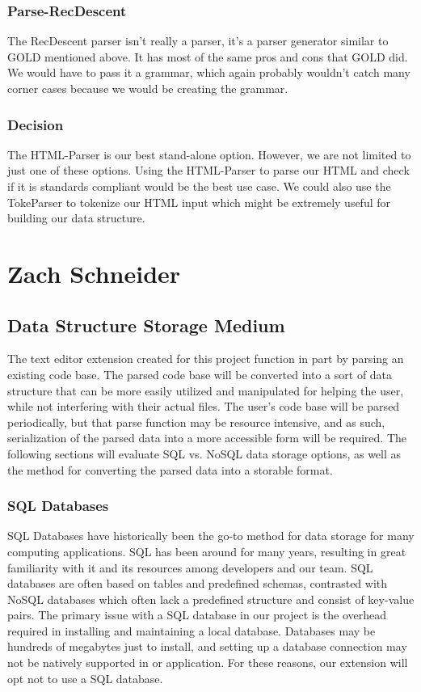 \documentclass[letterpaper,10pt,titlepage,draftclsnofoot,onecolumn,onesided] {IEEEtran}
\begin{document}
\subsubsection{Parse-RecDescent}
The RecDescent parser isn't really a parser, it's a parser generator similar to GOLD mentioned above.
It has most of the same pros and cons that GOLD did. 
We would have to pass it a grammar, which again probably wouldn't catch many corner cases because we would be creating the grammar.
\cite{recdescent}

\subsubsection{Decision}
The HTML-Parser is our best stand-alone option.
However, we are not limited to just one of these options.
Using the HTML-Parser to parse our HTML and check if it is standards compliant would be the best use case.
We could also use the TokeParser to tokenize our HTML input which might be extremely useful for building our data structure. 

\section{Zach Schneider}

\subsection{Data Structure Storage Medium}
The text editor extension created for this project function in part by parsing an existing code base. The parsed code base will be converted into a sort of data structure that can be more easily utilized and manipulated for helping the user, while not interfering with their actual files. The user's code base will be parsed periodically, but that parse function may be resource intensive, and as such, serialization of the parsed data into a more accessible form will be required. The following sections will evaluate SQL vs. NoSQL data storage options, as well as the method for converting the parsed data into a storable format.

\subsubsection{SQL Databases}
SQL Databases have historically been the go-to method for data storage for many computing applications. SQL has been around for many years, resulting in great familiarity with it and its resources among developers and our team. SQL databases are often based on tables and predefined schemas, contrasted with NoSQL databases which often lack a predefined structure and consist of key-value pairs. The primary issue with a SQL database in our project is the overhead required in installing and maintaining a local database. Databases may be hundreds of megabytes just to install, and setting up a database connection may not be natively supported in or application. For these reasons, our extension will opt not to use a SQL database. \cite{sql}
\end{document}
